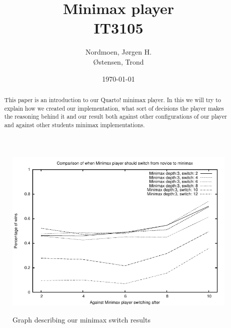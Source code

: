 \documentclass[titlepage, a4paper]{article}
\title{
	\quarto{} Minimax player \\
	IT3105 \\
}
\author{
	Nordmoen, Jørgen H. \\
	Østensen, Trond
}
\date{\today}
\newcommand{\quarto}{Quarto!}
\begin{document}
\maketitle

\begin{abstract}\label{abstract}
	This paper is an introduction to our \quarto{} minimax player. In this we will try to
	explain how we created our implementation, what sort of decisions the player makes
	the reasoning behind it and our result both against other configurations of our player
	and against other students minimax implementations.
\end{abstract}

\newpage
\tableofcontents
\listoffigures













\begin{figure}[htb]
	\includegraphics{graphs/switch.pdf}
	\label{fig:minimax switch}
	\caption{Graph describing our minimax switch results}
\end{figure}
\end{document}
